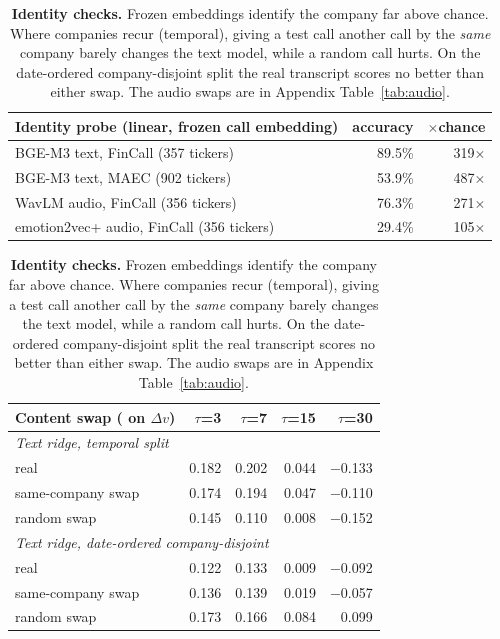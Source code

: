 \begin{table}[t]
\centering
\scriptsize
\setlength{\tabcolsep}{3pt}
\begin{tabular}{lrr}
\toprule
Identity probe (linear, frozen call embedding) & accuracy & $\times$chance \\
\midrule
BGE-M3 text, FinCall (357 tickers) & 89.5\% & 319$\times$ \\
BGE-M3 text, MAEC (902 tickers) & 53.9\% & 487$\times$ \\
WavLM audio, FinCall (356 tickers) & 76.3\% & 271$\times$ \\
emotion2vec+ audio, FinCall (356 tickers) & 29.4\% & 105$\times$ \\
\bottomrule
\end{tabular}

\vspace{0.2em}
\begin{tabular}{lrrrr}
\toprule
Content swap (\Rtwo{} on $\Delta v$) & $\tau$=3 & $\tau$=7 & $\tau$=15 & $\tau$=30 \\
\midrule
\multicolumn{5}{l}{\textit{Text ridge, temporal split}}\\
\quad real & 0.182 & 0.202 & 0.044 & $-$0.133 \\
\quad same-company swap & 0.174 & 0.194 & 0.047 & $-$0.110 \\
\quad random swap & 0.145 & 0.110 & 0.008 & $-$0.152 \\
\multicolumn{5}{l}{\textit{Text ridge, date-ordered company-disjoint}}\\
\quad real & 0.122 & 0.133 & 0.009 & $-$0.092 \\
\quad same-company swap & 0.136 & 0.139 & 0.019 & $-$0.057 \\
\quad random swap & 0.173 & 0.166 & 0.084 & 0.099 \\
\bottomrule
\end{tabular}
\caption{\textbf{Identity checks.} Frozen embeddings identify the company far
above chance. Where companies recur (temporal), giving a test call another call
by the \emph{same} company barely changes the text model, while a random call
hurts. On the date-ordered company-disjoint split the real transcript scores no
better than either swap. The audio swaps are in Appendix Table~\ref{tab:audio}.}
\label{tab:controls}
\end{table}
